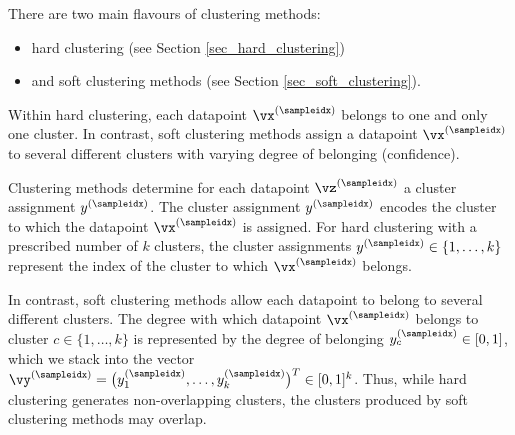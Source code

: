 \documentclass[12pt]{report}
\begin{document}
%
%

There are two main flavours of clustering methods: 
\begin{itemize} 
\item hard clustering (see Section \ref{sec_hard_clustering}) 
\item and soft clustering methods (see Section \ref{sec_soft_clustering}).
\end{itemize}
Within hard clustering, each datapoint $\vx^{(\sampleidx)}$ belongs to one and only one cluster. In contrast, 
soft clustering methods assign a datapoint $\vx^{(\sampleidx)}$ to several different clusters with varying degree 
of belonging (confidence). 

Clustering methods determine for each datapoint $\vz^{(\sampleidx)}$ 
a cluster assignment $y^{(\sampleidx)}$. The cluster assignment $y^{(\sampleidx)}$ 
encodes the cluster to which the datapoint $\vx^{(\sampleidx)}$ is assigned. 
For hard clustering with a prescribed number of $k$ clusters, the cluster assignments $y^{(\sampleidx)} \in \{1,\ldots,k\}$ 
represent the index of the cluster to which $\vx^{(\sampleidx)}$ belongs. 

In contrast, soft clustering methods allow each datapoint to belong to 
several different clusters. The degree with which datapoint $\vx^{(\sampleidx)}$ 
belongs to cluster $c \in \{1,\ldots,k\}$ is represented by the degree of 
belonging $y_{c}^{(\sampleidx)} \in [0,1]$, which we stack into the vector 
$\vy^{(\sampleidx)} = \big(y_{1}^{(\sampleidx)},\ldots,y_{k}^{(\sampleidx)}\big)^{T} \in [0,1]^{k}$. 
Thus, while hard clustering generates non-overlapping clusters, the 
clusters produced by soft clustering methods may overlap. 
\end{document}
